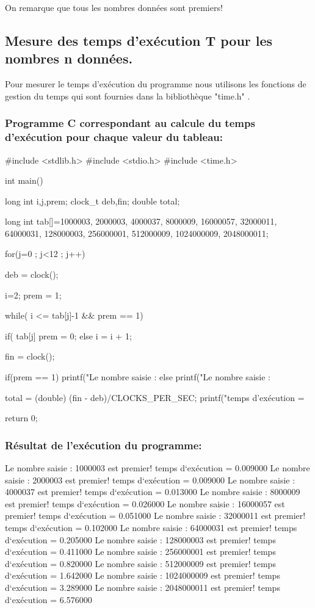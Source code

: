 \documentclass[12pt]{article}
\begin{document}
On remarque que tous les nombres données sont premiers!

\subsection{Mesure des temps d'exécution T pour les nombres n données.}

Pour mesurer le temps d'exécution du programme nous utilisons les fonctions de gestion du temps qui sont fournies dans la bibliothèque "time.h" .

\subsubsection{Programme C correspondant au calcule du temps d'exécution pour chaque valeur du tableau:}
\begin{sql}
#include <stdlib.h>
#include <stdio.h>
#include <time.h>

int main()
{
	long int i,j,prem;
	clock_t deb,fin;
	double total;

	long int tab[]={1000003, 2000003, 4000037, 8000009, 16000057, 32000011,	64000031, 128000003, 256000001,	512000009,	1024000009, 2048000011};

for(j=0 ; j<12 ; j++)
{
	deb = clock();
	
	i=2;
	prem = 1;

	while( i <= tab[j]-1 && prem == 1){

		if( tab[j]%
			prem = 0;
		else
			i = i + 1;
	}

	fin = clock();

	if(prem == 1)
    {
        printf("Le nombre saisie : %
    }
	else{
        printf("Le nombre saisie : %
	}

	total = (double) (fin - deb)/CLOCKS_PER_SEC;
	printf("temps d'exécution = %
}
return 0;
}
\end{sql}

\subsubsection{Résultat de l'exécution du programme:}
\begin{sql}
Le nombre saisie : 1000003 est premier!
temps d`exécution = 0.009000
Le nombre saisie : 2000003 est premier!
temps d`exécution = 0.009000
Le nombre saisie : 4000037 est premier!
temps d`exécution = 0.013000
Le nombre saisie : 8000009 est premier!
temps d`exécution = 0.026000
Le nombre saisie : 16000057 est premier!
temps d`exécution = 0.051000
Le nombre saisie : 32000011 est premier!
temps d`exécution = 0.102000
Le nombre saisie : 64000031 est premier!
temps d`exécution = 0.205000
Le nombre saisie : 128000003 est premier!
temps d`exécution = 0.411000
Le nombre saisie : 256000001 est premier!
temps d`exécution = 0.820000
Le nombre saisie : 512000009 est premier!
temps d`exécution = 1.642000
Le nombre saisie : 1024000009 est premier!
temps d`exécution = 3.289000
Le nombre saisie : 2048000011 est premier!
temps d`exécution = 6.576000
\end{sql}
\end{document}
